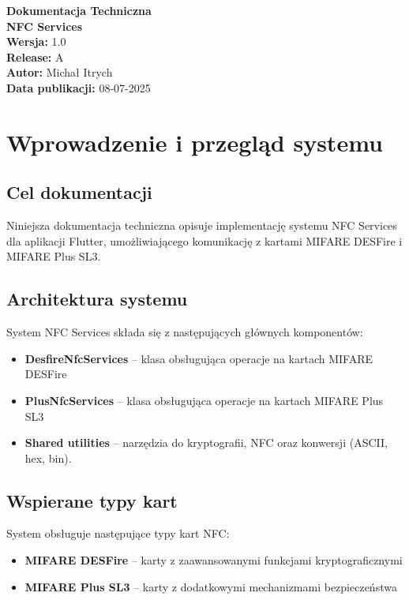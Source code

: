 \documentclass[a4paper,12pt]{article}
\begin{document}
\vspace*{1cm}

\begin{center}
\begin{tcolorbox}[width=0.8\textwidth, sharp corners, boxrule=0.5pt]
    \centering
    \textbf{\Large Dokumentacja Techniczna \\ NFC Services} \\[1.5em]
    \textbf{Wersja:} 1.0 \\
    \textbf{Release:} A \\[1.5em]
    \textbf{Autor:} Michał Itrych \\[1.5em]
    \textbf{Data publikacji:} 08-07-2025
\end{tcolorbox}
\end{center}

\newpage
\tableofcontents
\newpage

\section{Wprowadzenie i przegląd systemu}

\subsection{Cel dokumentacji}
Niniejsza dokumentacja techniczna opisuje implementację systemu NFC Services dla aplikacji Flutter, umożliwiającego komunikację z kartami MIFARE DESFire i MIFARE Plus SL3.

\subsection{Architektura systemu}
System NFC Services składa się z następujących głównych komponentów:

\begin{itemize}
    \item \textbf{DesfireNfcServices} -- klasa obsługująca operacje na kartach MIFARE DESFire
    \item \textbf{PlusNfcServices} -- klasa obsługująca operacje na kartach MIFARE Plus SL3
    \item \textbf{Shared utilities} -- narzędzia do kryptografii, NFC oraz konwersji (ASCII, hex, bin).
\end{itemize}

\subsection{Wspierane typy kart}
System obsługuje następujące typy kart NFC:
\begin{itemize}
    \item \textbf{MIFARE DESFire} -- karty z zaawansowanymi funkcjami kryptograficznymi
    \item \textbf{MIFARE Plus SL3} -- karty z dodatkowymi mechanizmami bezpieczeństwa
\end{itemize}
\end{document}
